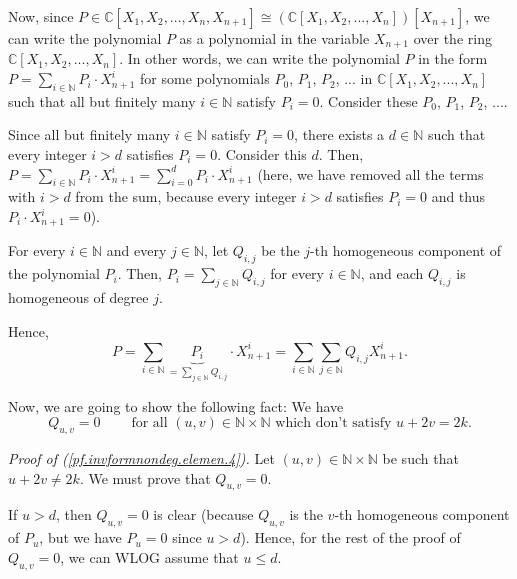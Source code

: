 \documentclass[etingof-lie.tex]{subfiles}
\begin{document}
Now, since $P\in\mathbb{C}\left[  X_{1},X_{2},...,X_{n},X_{n+1}\right]
\cong\left(  \mathbb{C}\left[  X_{1},X_{2},...,X_{n}\right]  \right)  \left[
X_{n+1}\right]  $, we can write the polynomial $P$ as a polynomial in the
variable $X_{n+1}$ over the ring $\mathbb{C}\left[  X_{1},X_{2},...,X_{n}%
\right]  $. In other words, we can write the polynomial $P$ in the form
$P=\sum\limits_{i\in\mathbb{N}}P_{i}\cdot X_{n+1}^{i}$ for some polynomials
$P_{0}$, $P_{1}$, $P_{2}$, $...$ in $\mathbb{C}\left[  X_{1},X_{2}%
,...,X_{n}\right]  $ such that all but finitely many $i\in\mathbb{N}$ satisfy
$P_{i}=0$. Consider these $P_{0}$, $P_{1}$, $P_{2}$, $...$.

Since all but finitely many $i\in\mathbb{N}$ satisfy $P_{i}=0$, there exists a
$d\in\mathbb{N}$ such that every integer $i>d$ satisfies $P_{i}=0$. Consider
this $d$. Then, $P=\sum\limits_{i\in\mathbb{N}}P_{i}\cdot X_{n+1}^{i}%
=\sum\limits_{i=0}^{d}P_{i}\cdot X_{n+1}^{i}$ (here, we have removed all the
terms with $i>d$ from the sum, because every integer $i>d$ satisfies $P_{i}=0$
and thus $P_{i}\cdot X_{n+1}^{i}=0$).

For every $i\in\mathbb{N}$ and every $j\in\mathbb{N}$, let $Q_{i,j}$ be the
$j$-th homogeneous component of the polynomial $P_{i}$. Then, $P_{i}%
=\sum\limits_{j\in\mathbb{N}}Q_{i,j}$ for every $i\in\mathbb{N}$, and each
$Q_{i,j}$ is homogeneous of degree $j$.

Hence,%
\begin{equation}
P=\sum\limits_{i\in\mathbb{N}}\underbrace{P_{i}}_{=\sum\limits_{j\in
\mathbb{N}}Q_{i,j}}\cdot X_{n+1}^{i}=\sum\limits_{i\in\mathbb{N}}%
\sum\limits_{j\in\mathbb{N}}Q_{i,j}X_{n+1}^{i}.
\label{pf.invformnondeg.elemen.3a}%
\end{equation}


Now, we are going to show the following fact: We have%
\begin{equation}
Q_{u,v}=0\ \ \ \ \ \ \ \ \ \ \text{for all }\left(  u,v\right)  \in
\mathbb{N}\times\mathbb{N}\text{ which don't satisfy }u+2v=2k.
\label{pf.invformnondeg.elemen.4}%
\end{equation}


\textit{Proof of (\ref{pf.invformnondeg.elemen.4}).} Let $\left(  u,v\right)
\in\mathbb{N}\times\mathbb{N}$ be such that $u+2v\neq2k$. We must prove that
$Q_{u,v}=0$.

If $u>d$, then $Q_{u,v}=0$ is clear (because $Q_{u,v}$ is the $v$-th
homogeneous component of $P_{u}$, but we have $P_{u}=0$ since $u>d$). Hence,
for the rest of the proof of $Q_{u,v}=0$, we can WLOG assume that $u\leq d$.
\end{document}

